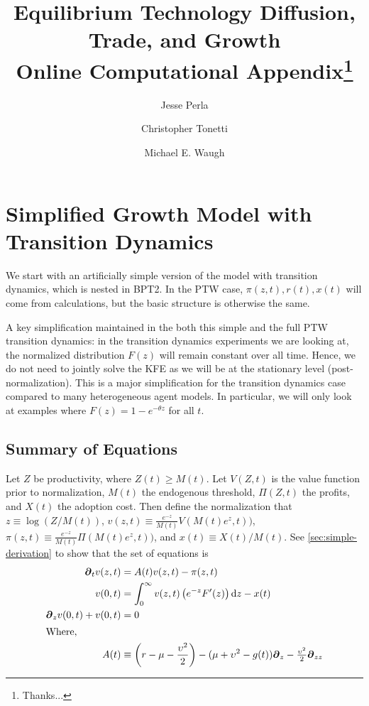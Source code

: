 \documentclass[11pt]{article}
\newcommand{\D}[1][]{\ensuremath{\boldsymbol{\partial}_{#1}}}
\newcommand{\diff}{\ensuremath{\mathrm{d}}}
\begin{document}
\title{Equilibrium Technology Diffusion, Trade, and Growth\\Online Computational Appendix\thanks{Thanks...}}
\author{Jesse Perla \and Christopher Tonetti \and Michael E. Waugh}
\maketitle

\section{Simplified Growth Model with Transition Dynamics}
We start with an artificially simple version of the model with transition dynamics, which is nested in BPT2.  In the PTW case, $\pi(z,t), r(t), x(t)$ will come from calculations, but the basic structure is otherwise the same.

A key simplification maintained in the both this simple and the full PTW transition dynamics: in the transition dynamics experiments we are looking at, the normalized distribution $F(z)$ will remain constant over all time.  Hence, we do not need to jointly solve the KFE as we will be at the stationary level (post-normalization).  This is a major simplification for the transition dynamics case compared to many heterogeneous agent models.  In particular, we will only look at examples where $F(z) = 1 - e^{-\theta z}$ for all $t$.

\subsection{Summary of Equations}
Let $Z$ be productivity, where $Z(t) \geq M(t)$.  Let $V(Z,t)$ is the value function prior to normalization, $M(t)$ the endogenous threshold, $\Pi(Z,t)$ the profits, and $X(t)$ the adoption cost.  Then define the normalization that $z \equiv \log(Z/M(t))$, $v(z,t) \equiv \frac{e^{-z}}{M(t)}V(M(t)e^z, t))$, $\pi(z,t) \equiv \frac{e^{-z}}{M(t)}\Pi(M(t)e^z, t))$, and $x(t) \equiv X(t)/M(t)$.  See \cref{sec:simple-derivation} to show that the set of equations is
\begin{align}
\D[t]v(z,t) &= A(t)v(z,t) - \pi(z,t)\label{eq:simple-summary1}\\
v(0,t) &= \int_{0}^{\infty}  v(z,t) \left(e^{-z} F'(z)\right) \diff z - x(t)\label{eq:simple-summary2}\\
\D[z]v(0,t) + v(0,t) &= 0\label{eq:simple-summary3}\\
\intertext{Where,}
A(t) &\equiv \left(r - \mu - \frac{\upsilon^2}{2}\right) - (\mu+ \upsilon^2 - g(t)) \D[z] - \tfrac{\upsilon^2}{2} \D[zz]\label{eq:simple-summary4}
\end{align} 
\end{document}
